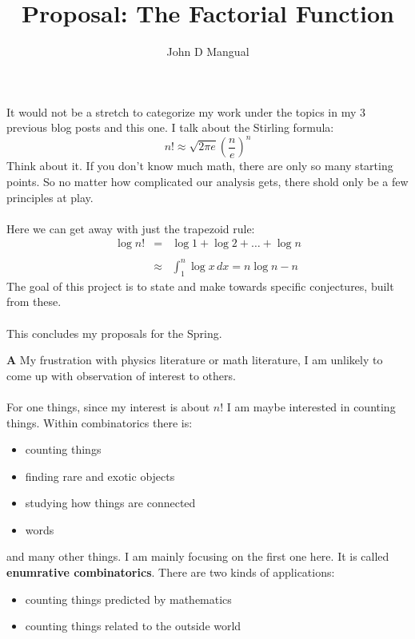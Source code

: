 \documentclass[12pt]{article}
\title{\textbf{Proposal: The Factorial Function}}
\author{John D Mangual}
\date{}
\begin{document}
\selectfont \fontsize{20}{25}\selectfont

\maketitle

\noindent It would not be a stretch to categorize my work under the topics in my 3 previous blog posts and this one.  I talk about the Stirling formula:
$$ n! \approx \sqrt{2 \pi e } \left( \frac{n}{e} \right)^n $$
Think about it.  If you don't know much math, there are only so many starting points.  So no matter how complicated our analysis gets, there shold only be a few principles at play. \\ \\
Here we can get away with just the trapezoid rule:
\begin{eqnarray*} \log n! &=& \log 1 + \log 2 + \dots + \log n \\ \\
& \approx &
\int_1^n \log x \, dx = n \log n - n \end{eqnarray*}
The goal of this project is to state and make towards specific conjectures, built from these. \\ \\
This concludes my proposals for the Spring.

\newpage

\noindent \textbf{A} My frustration with physics literature or math literature, I am unlikely to come up with observation of interest to others. \\ \\
For one things, since my interest is about $n!$ I am maybe interested in counting things.  Within combinatorics there is:
 \begin{itemize}
 \item counting things
 \item finding rare and exotic objects
 \item studying how things are connected
 \item words
 \end{itemize}
 and many other things.  I am mainly focusing on the first one here.  It is called \textbf{enumrative combinatorics}.  There are two kinds of applications:
 \begin{itemize}
 \item counting things predicted by mathematics
 \item counting things related to the outside world
 \end{itemize}
\end{document}
